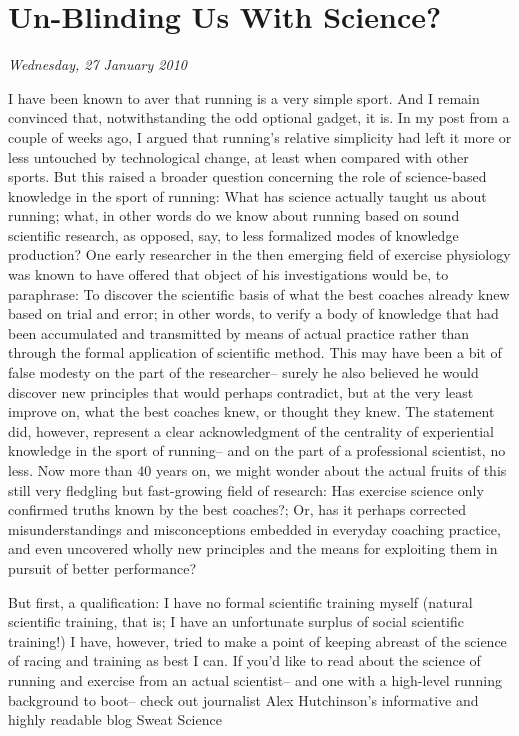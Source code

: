 \chapter{Un-Blinding Us With Science?}
\textit{Wednesday, 27 January 2010}
\bigskip

I have been known to aver that running is a very simple sport. And I remain convinced that, notwithstanding the odd optional gadget, it is. In my post from a couple of weeks ago, I argued that running's relative simplicity had left it more or less untouched by technological change, at least when compared with other sports. But this raised a broader question concerning the role of science-based knowledge in the sport of running: What has science actually taught us about running; what, in other words do we know about running based on sound scientific research, as opposed, say, to less formalized modes of knowledge production? One early researcher in the then emerging field of exercise physiology was known to have offered that object of his investigations would be, to paraphrase: To discover the scientific basis of what the best coaches already knew based on trial and error; in other words, to verify a body of knowledge that had been accumulated and transmitted by means of actual practice rather than through the formal application of scientific method. This may have been a bit of false modesty on the part of the researcher-- surely he also believed he would discover new principles that would perhaps contradict, but at the very least improve on, what the best coaches knew, or thought they knew. The statement did, however, represent a clear acknowledgment of the centrality of experiential knowledge in the sport of running-- and on the part of a professional scientist, no less. Now more than 40 years on, we might wonder about the actual fruits of this still very fledgling but fast-growing field of research: Has exercise science only confirmed truths known by the best coaches?; Or, has it perhaps corrected misunderstandings and misconceptions embedded in everyday coaching practice, and even uncovered wholly new principles and the means for exploiting them in pursuit of better performance?

But first, a qualification: I have no formal scientific training myself (natural scientific training, that is; I have an unfortunate surplus of social scientific training!) I have, however, tried to make a point of keeping abreast of the science of racing and training as best I can. If you'd like to read about the science of running and exercise from an actual scientist-- and one with a high-level running background to boot-- check out journalist Alex Hutchinson's informative and highly readable blog Sweat Science

